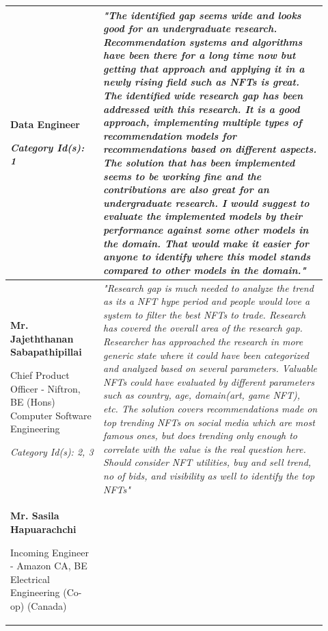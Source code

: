 \begin{longtable}{|p{0.27\linewidth}|p{0.655\linewidth}|}
Data Engineer

\textit{Category Id(s): 1}
&
\textit{"The identified gap seems wide and looks good for an undergraduate research. Recommendation systems and algorithms have been there for a long time now but getting that approach and applying it in a newly rising field such as NFTs is great. The identified wide research gap has been addressed with this research. It is a good approach, implementing multiple types of recommendation models for recommendations based on different aspects. The solution that has been implemented seems to be working fine and the contributions are also great for an undergraduate research. I would suggest to evaluate the implemented models by their performance against some other models in the domain. That would make it easier for anyone to identify where this model stands compared to other models in the domain."}
\\
\hline
\textbf{Mr. Jajeththanan Sabapathipillai}

Chief Product Officer - Niftron, BE (Hons) Computer Software Engineering

\textit{Category Id(s): 2, 3}
 &
 \textit{"Research gap is much needed to analyze the trend as its a NFT hype period and people would love a system to filter the best NFTs to trade. Research has covered the overall area of the research gap. Researcher has approached the research in more generic state where it could have been categorized and analyzed based on several parameters. Valuable NFTs could have evaluated by different parameters such as country, age, domain(art, game NFT), etc. The solution covers recommendations made on top trending NFTs on social media which are most famous ones, but does trending only enough to correlate with the value is the real question here. Should consider NFT utilities, buy and sell trend, no of bids, and visibility as well to identify the top NFTs"}
 \\
\hline
\textbf{Mr. Sasila Hapuarachchi}

 Incoming Engineer - Amazon CA,
 BE Electrical Engineering (Co-op) (Canada)


\end{longtable}
